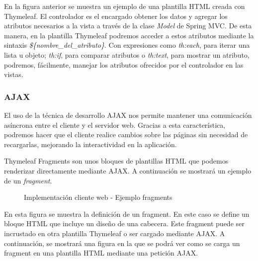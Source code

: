 En la figura anterior se muestra un ejemplo de una plantilla HTML creada con Thymeleaf. El controlador es el encargado obtener los datos y agregar los atributos necesarios a la vista a través de la clase \textit{Model} de Spring MVC. De esta manera, en la plantilla Thymeleaf podremos acceder a estos atributos mediante la sintaxis \textit{\$\{nombre\_del\_atributo\}}. Con expresiones como \textit{th:each}, para iterar una lista u objeto; \textit{th:if}, para comparar atributos o \textit{th:text}, para mostrar un atributo, podremos, fácilmente, manejar los atributos ofrecidos por el controlador en las vistas. 


\subsubsection*{AJAX}
El uso de la técnica de desarrollo AJAX nos permite mantener una comunicación asíncrona entre el cliente y el servidor web. Gracias a esta característica, podremos hacer que el cliente realice cambios sobre las páginas sin necesidad de recargarlas, mejorando la interactividad en la aplicación.

Thymeleaf Fragments son unos bloques de plantillas HTML que podemos renderizar directamente mediante AJAX. A continuación se mostrará un ejemplo de un \textit{fragment}.

\begin{figure}[H]
\centering
{}
\caption{Implementación cliente web - Ejemplo fragments}
\end{figure}

En esta figura se muestra la definición de un fragment. En este caso se define un bloque HTML que incluye un diseño de una cabecera. Este fragment puede ser incrustado en otra plantilla Thymeleaf o ser cargado mediante AJAX. A continuación, se mostrará una figura en la que se podrá ver como se carga un fragment en una plantilla HTML mediante una petición AJAX.

